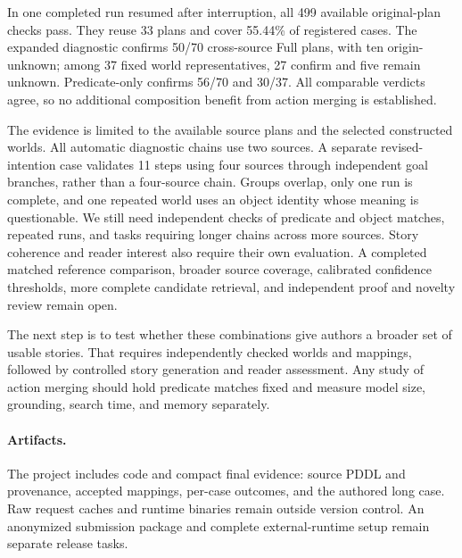 \documentclass[letterpaper]{article}
\begin{document}
In one completed run resumed after interruption, all 499 available original-plan checks pass. They reuse 33 plans and cover 55.44\% of registered cases. The expanded diagnostic confirms 50/70 cross-source Full plans, with ten origin-unknown; among 37 fixed world representatives, 27 confirm and five remain unknown. Predicate-only confirms 56/70 and 30/37. All comparable verdicts agree, so no additional composition benefit from action merging is established.

The evidence is limited to the available source plans and the selected constructed worlds. All automatic diagnostic chains use two sources. A separate revised-intention case validates 11 steps using four sources through independent goal branches, rather than a four-source chain. Groups overlap, only one run is complete, and one repeated world uses an object identity whose meaning is questionable. We still need independent checks of predicate and object matches, repeated runs, and tasks requiring longer chains across more sources. Story coherence and reader interest also require their own evaluation. A completed matched reference comparison, broader source coverage, calibrated confidence thresholds, more complete candidate retrieval, and independent proof and novelty review remain open.

The next step is to test whether these combinations give authors a broader set of usable stories. That requires independently checked worlds and mappings, followed by controlled story generation and reader assessment. Any study of action merging should hold predicate matches fixed and measure model size, grounding, search time, and memory separately.

\paragraph{Artifacts.}
The project includes code and compact final evidence: source PDDL and provenance, accepted mappings, per-case outcomes, and the authored long case. Raw request caches and runtime binaries remain outside version control. An anonymized submission package and complete external-runtime setup remain separate release tasks.


\end{document}
